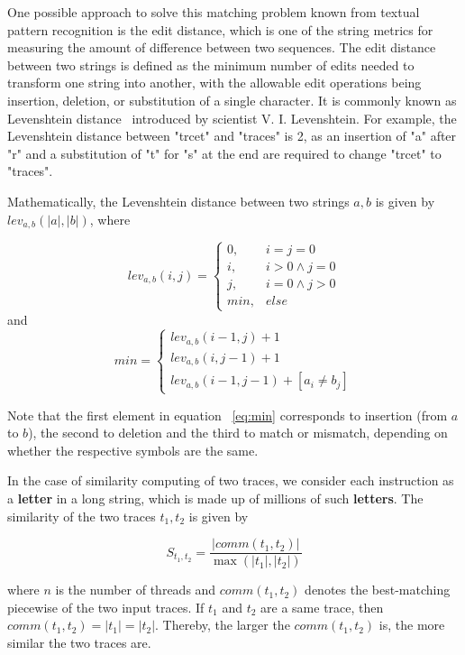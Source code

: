 \documentclass[10pt,journal,cspaper,compsoc]{IEEEtran}
\begin{document}
One possible approach to solve this matching problem known from
textual pattern recognition is the edit distance, which is one of
the string metrics for measuring the amount of difference between
two sequences. The edit distance between two strings is defined as
the minimum number of edits needed to transform one string into
another, with the allowable edit operations being insertion,
deletion, or substitution of a single character. It is commonly
known as Levenshtein distance~\cite{distance66} introduced by
scientist V. I. Levenshtein. For example, the Levenshtein distance
between "trcet" and "traces" is 2, as an insertion of "a" after "r"
and a substitution of "t" for "s" at the end are required to change
"trcet" to "traces".

Mathematically, the Levenshtein distance between two strings $a, b$
is given by $lev_{a,b}(|a|,|b|)$, where

\begin{equation}\label{eq:ed}
lev_{a,b}(i,j)=\begin{cases}
0, &i=j=0\\
i, &i>0\wedge j=0\\
j, &i=0\wedge j>0\\
min, &else
\end{cases}
\end{equation}
and
\begin{equation}\label{eq:min}
min=\begin{cases}
lev_{a,b}(i-1,j)+1 \\
lev_{a,b}(i, j-1)+1 \\
lev_{a,b}(i-1,j-1)+[a_i \ne b_j]
\end{cases}
\end{equation}

Note that the first element in equation ~\ref{eq:min} corresponds to
insertion (from $a$ to $b$), the second to deletion and the third to
match or mismatch, depending on whether the respective symbols are
the same.

In the case of similarity computing of two traces, we consider each
instruction as a \textbf{letter} in a long string, which is made up
of millions of such \textbf{letters}. The similarity of the two
traces $t_{1}, t_{2}$ is given by

\begin{equation}\label{eq:sim}
 S_{t_{1},t_{2}} = \frac{|comm(t_1, t_2)|}{
 \max{(|t_1|,|t_{2}|)}}
\end{equation}

where $n$ is the number of threads and $comm(t_1, t_2)$ denotes the
best-matching piecewise of the two input traces. If $t_1$ and $t_2$
are a same trace, then $comm(t_1, t_2)=|t_1|=|t_2|$. Thereby, the
larger the $comm(t_1, t_2)$ is, the more similar the two traces are.
\end{document}
